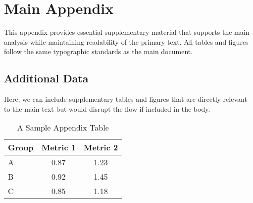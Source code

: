 %
%
%
%
%

\section{Main Appendix}
\label{app:main}

This appendix provides essential supplementary material that supports the main analysis while maintaining readability of the primary text. All tables and figures follow the same typographic standards as the main document.

\subsection{Additional Data}
\label{app:additional-data}

Here, we can include supplementary tables and figures that are directly relevant to the main text but would disrupt the flow if included in the body.

\begin{table}[h!]
  \centering
  \caption{A Sample Appendix Table}
  \label{tab:app:appendix-table}
  \begin{tabular}{lcc}
    \toprule
    Group & Metric 1 & Metric 2 \\
    \midrule
    A & 0.87 & 1.23 \\
    B & 0.92 & 1.45 \\
    C & 0.85 & 1.18 \\
    \bottomrule
  \end{tabular}
\end{table}